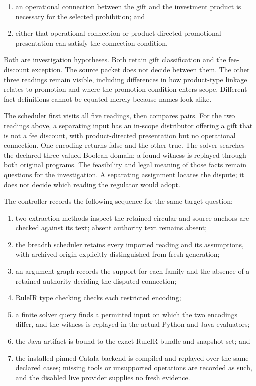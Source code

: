 \documentclass[12pt,a4paper,oneside,openany]{book}
\begin{document}
\begin{enumerate}
\item an operational connection between the gift and the investment product
      is necessary for the selected prohibition; and
\item either that operational connection or product-directed promotional
      presentation can satisfy the connection condition.
\end{enumerate}

Both are investigation hypotheses. Both retain gift classification and the
fee-discount exception. The source packet does not decide between them. The
other three readings remain visible, including differences in how product-type
linkage relates to promotion and where the promotion condition enters scope.
Different fact definitions cannot be equated merely because names look alike.

The scheduler first visits all five readings, then compares pairs. For the two
readings above, a separating input has an in-scope distributor offering a gift
that is not a fee discount, with product-directed presentation but no operational
connection. One encoding returns false and the other true. The solver searches
the declared three-valued Boolean domain; a found witness is replayed through
both original programs. The feasibility and legal meaning of those facts remain
questions for the investigation. A separating assignment locates the dispute;
it does not decide which reading the regulator would adopt.

The controller records the following sequence for the same target question:

\begin{enumerate}
\item two extraction methods inspect the retained circular and source anchors
      are checked against its text; absent authority text remains absent;
\item the breadth scheduler retains every imported reading and its assumptions,
      with archived origin explicitly distinguished from fresh generation;
\item an argument graph records the support for each family and the absence of
      a retained authority deciding the disputed connection;
\item RuleIR type checking checks each restricted encoding;
\item a finite solver query finds a permitted input on which the two encodings
      differ, and the witness is replayed in the actual Python and Java
      evaluators;
\item the Java artifact is bound to the exact RuleIR bundle and snapshot set;
      and
\item the installed pinned Catala backend is compiled and replayed over the
      same declared cases; missing tools or unsupported operations are recorded
      as such, and the disabled live provider supplies no fresh evidence.
\end{enumerate}
\end{document}

